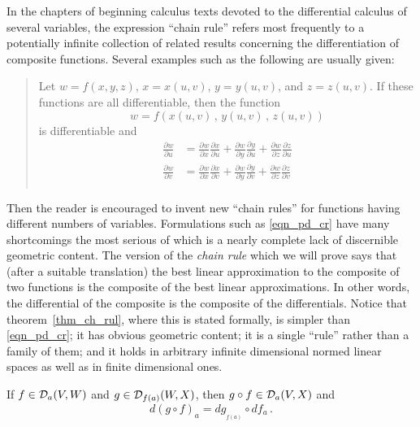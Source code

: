 In the chapters of beginning calculus texts devoted to the differential calculus of several
variables, the expression ``chain rule'' refers most frequently to a potentially infinite
collection of related results concerning the differentiation of composite functions.  Several
examples such as the following are usually given:

\begin{quote}
Let $w = f(x,y,z)$, $x = x(u,v)$, $y = y(u,v)$, and $z = z(u,v)$. If these functions are all
differentiable, then the function
  \[ w = f(x(u,v)\,,\,y(u,v)\,,\,z(u,v)) \]
is differentiable and
 \begin{equation*}\tag{$\ast$}
  \begin{split}\label{eqn_pd_cr}
    \frac{\partial w}{\partial u}
     &= \frac{\partial w}{\partial x}\frac{\partial x}{\partial u}
     + \frac{\partial w}{\partial y}\frac{\partial y}{\partial u}
     + \frac{\partial w}{\partial z}\frac{\partial z}{\partial u}\\
   \frac{\partial w}{\partial v}
     &= \frac{\partial w}{\partial x}\frac{\partial x}{\partial v}
     + \frac{\partial w}{\partial y}\frac{\partial y}{\partial v}
     + \frac{\partial w}{\partial z}\frac{\partial z}{\partial v}\\
  \end{split}
 \end{equation*}
\end{quote}

\noindent Then the reader is encouraged to invent new ``chain rules'' for functions having
different numbers of variables. Formulations such as \eqref{eqn_pd_cr} have many shortcomings
the most serious of which is a nearly complete lack of discernible geometric content.  The
version of the \emph{chain rule} which we will prove says that (after a suitable translation)
the best linear approximation to the composite of two functions is the composite of the best
linear approximations.  In other words, the differential of the composite is the composite of
the differentials.  Notice that theorem~\ref{thm_ch_rul}, where this is stated formally, is
simpler than \eqref{eqn_pd_cr}; it has obvious geometric content; it is a single ``rule''
rather than a family of them; and it holds in arbitrary infinite dimensional normed linear
spaces as well as in finite dimensional ones.

\begin{prop}\label{thm_ch_rul}
If $f \in \mathcal{D}_a(V,W)$ and $g \in \mathcal{D}_{f(a)}(W,X)$, then $g \circ f \in \mathcal{D}_a(V,X)$
and
  \[ d(g \circ f)_a = dg_{{}_{\scriptstyle{f(a)}}} \circ df_a\,. \]
\end{prop}

